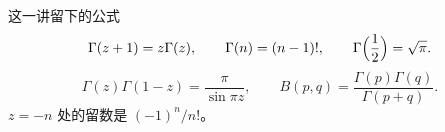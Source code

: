 \documentclass[fontset=windows, chinese, 10pt, xcolor=dvipsnames]{beamer}
\begin{document}
\begin{frame}{这一讲留下的公式}
  \[
    \Gamma(z+1)=z\Gamma(z),
    \qquad
    \Gamma(n)=(n-1)!,
    \qquad
    \Gamma\Bigl(\frac12\Bigr)=\sqrt{\pi}.
  \]
  \[
    \Gamma(z)\Gamma(1-z)=\frac{\pi}{\sin\pi z},
    \qquad
    B(p,q)=\frac{\Gamma(p)\Gamma(q)}{\Gamma(p+q)}.
  \]
  $z=-n$ 处的留数是 $(-1)^n/n!$。
\end{frame}
\end{document}
